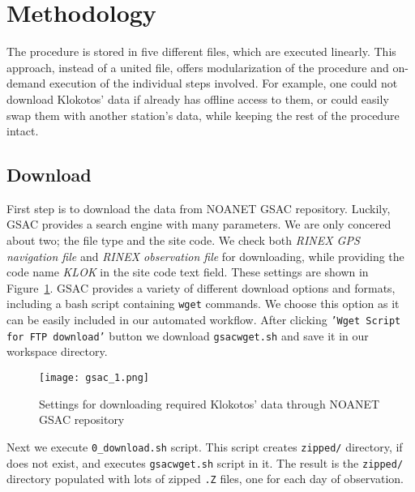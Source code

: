 \documentclass[
12pt, %
a4paper, %
oneside, %
headinclude,footinclude, %
BCOR5mm, %
]{article}
\begin{document}

\section{Methodology}

The procedure is stored in five different files, which are executed linearly. This approach, instead of a united file, offers modularization of the procedure and on-demand execution of the individual steps involved. For example, one could not download Klokotos' data if already has offline access to them, or could easily swap them with another station's data, while keeping the rest of the procedure intact.

\subsection{Download}
First step is to download the data from NOANET GSAC repository. Luckily, GSAC provides a search engine with many parameters. We are only concered about two; the file type and the site code. We check both \textit{RINEX GPS navigation file} and \textit{RINEX observation file} for downloading, while providing the code name \textit{KLOK} in the site code text field. These settings are shown in Figure~\ref{fig:gsac1}. GSAC provides a variety of different download options and formats, including a bash script containing \texttt{wget} commands. We choose this option as it can be easily included in our automated workflow. After clicking \texttt{'Wget Script for FTP download'} button we download \texttt{gsacwget.sh} and save it in our workspace directory.

\begin{figure}[h!]
\centering
\texttt{[image: gsac\_1.png]}
\caption[text]{Settings for downloading required Klokotos' data through NOANET GSAC repository}
\label{fig:gsac1}
\end{figure}

Next we execute \texttt{0\_download.sh} script. This script creates \texttt{zipped/} directory, if does not exist, and executes \texttt{gsacwget.sh} script in it. The result is the \texttt{zipped/} directory populated with lots of zipped \texttt{.Z} files, one for each day of observation.

\vfill

\vspace*{25pt}

\end{document}
